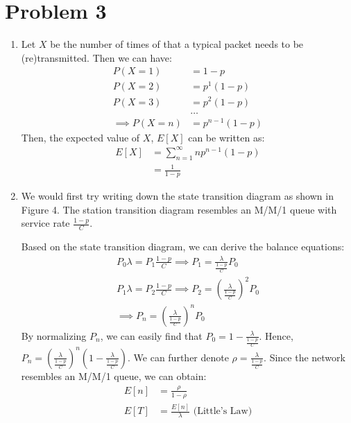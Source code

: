 \documentclass{article}
\begin{document}
\section*{Problem 3}
	\begin{enumerate}
		\item Let $X$ be the number of times of that a typical packet needs to be
			(re)transmitted. Then we can have:
			\begin{align*}
				P({X=1}) &= 1-p \\
				P({X=2}) &= p^{1}(1-p) \\
				P({X=3}) &= p^{2}(1-p) \\
				&\ldots \\
				\implies P({X=n}) &= p^{n-1}(1-p)
			\end{align*}
			Then, the expected value of $X$, $E[X]$ can be written as:
			\begin{align*}
				E[X] &= \sum\limits_{n=1}^{\infty} np^{n-1}(1-p) \\
				&= \frac{1}{1-p}
			\end{align*}
		\item We would first try writing down the state transition diagram as shown
			in Figure 4. The station transition diagram resembles an M/M/1 queue with
			service rate $\frac{1-p}{C}$.
			\vspace{40mm}
			
			Based on the state transition diagram, we can derive the balance
			equations:
			\begin{gather*}
				P_{0} \lambda = P_{1} \frac{1-p}{C} \implies P_{1} = \frac{\lambda}{\frac{1-p}{C}} P_{0} \\
				P_{1} \lambda = P_{2} \frac{1-p}{C} \implies P_{2} = \left(\frac{\lambda}{\frac{1-p}{C}}\right)^{2} P_{0} \\
				\implies P_{n} = \left(\frac{\lambda}{\frac{1-p}{C}}\right)^{n} P_{0}
			\end{gather*}
			By normalizing $P_{n}$, we can easily find that $P_{0}=1-\frac{\lambda}{\frac{1-p}{C}}$.
			Hence, $P_{n}=\left(\frac{\lambda}{\frac{1-p}{C}}\right)^{n} \left(1-\frac{\lambda}{\frac{1-p}{C}}\right)$.
			We can further denote $\rho=\frac{\lambda}{\frac{1-p}{C}}$.
			Since the network resembles an M/M/1 queue, we can obtain:
			\begin{align*}
				E[n] &= \frac{\rho}{1-\rho} \\
				E[T] &= \frac{E[n]}{\lambda} \text{ (Little's Law)}
			\end{align*}
	\end{enumerate}
\end{document}
